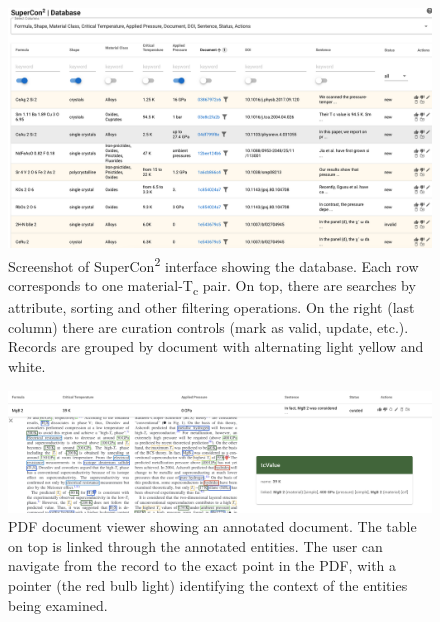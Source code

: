 \documentclass[]{interact}
\theoremstyle{plain} %
\theoremstyle{definition}
\theoremstyle{remark}
\begin{document}
\begin{figure}[ht]
  \centering
  \includegraphics[width=1\textwidth]{images/supercon-curation-database.png} 
  \caption{Screenshot of SuperCon\textsuperscript{2} interface showing the database. Each row corresponds to one material-T\textsubscript{c} pair. On top, there are searches by attribute, sorting and other filtering operations. On the right (last column) there are curation controls (mark as valid, update, etc.).   Records are grouped by document with alternating light yellow and white. }
  \label{fig:curation-interface-database}
\end{figure}

\begin{figure}[ht]
  \centering
  \includegraphics[width=1\textwidth]{images/pdf-view-context.png} 
  \caption{PDF document viewer showing an annotated document. The table on top is linked through the annotated entities. The user can navigate from the record to the exact point in the PDF, with a pointer (the red bulb light) identifying the context of the entities being examined. }
  \label{fig:pdf-view}
\end{figure}
\end{document}

